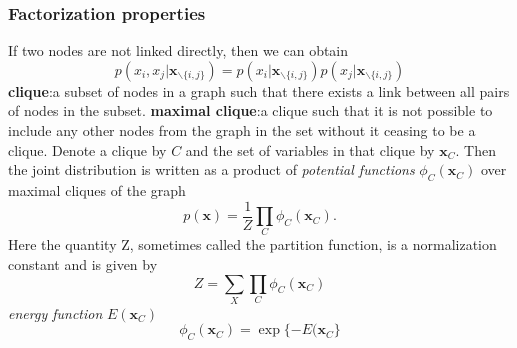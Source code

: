\documentclass[a4paper]{book}
\renewcommand{\bf}{\mathbf}
\begin{document}
\subsubsection{Factorization properties}
If two nodes are not linked directly, then we can obtain
\begin{equation}\label{eq8.10}
  p(x_i,x_j|\bf{x}_{\backslash\{i,j\}}) = p(x_i|\bf x_{\backslash\{i,j\}})p(x_j|\bf x_{\backslash\{i,j\}})
\end{equation}
\textbf{clique}:a subset of nodes in a graph such that there exists a link between all pairs of nodes in the subset. \newline
\textbf{maximal clique}:a clique such that it is not possible to include any
other nodes from the graph in the set without it ceasing to be a clique.\newline
Denote a clique by $C$ and the set of variables in that clique by $\bf x_C$. Then the joint distribution is written as a product of \emph{potential functions}
$\phi_C(\bf x_C)$ over maximal cliques of the graph
\begin{equation}\label{eq8.11}
  p(\bf x) = \frac{1}{Z}\prod_{C}\phi_C(\bf x_C).
\end{equation}
Here the quantity Z, sometimes called the partition function, is a normalization constant
and is given by
\begin{equation}\label{eq8.12}
  Z=\sum_{X}\prod_{C}\phi_C(\bf x_C)
\end{equation}
\emph{energy function} $E(\bf x_C)$
\begin{equation}\label{eq8.13}
  \phi_C(\bf x_C) = \exp\{-E(\bf x_C\}
\end{equation}
\end{document}
